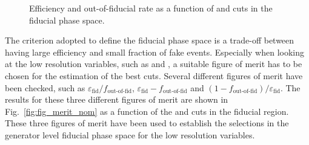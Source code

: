 \begin{figure}[htb]
\centering
{}
\caption{Efficiency and out-of-fiducial rate as a function of \MET and \mt cuts in the fiducial phase space.}\label{fig:eff_fake_nom}
\end{figure}

The criterion adopted to define the fiducial phase space is a trade-off between having large efficiency and small fraction of fake events. Especially when looking at the low resolution variables, such as \MET and \mt, a suitable figure of merit has to be chosen for the estimation of the best cuts. Several different figures of merit have been checked, such as $\varepsilon_\mathrm{fid}/f_\text{out-of-fid}$, $\varepsilon_\mathrm{fid} - f_\text{out-of-fid}$ and $(1-f_\text{out-of-fid})/\varepsilon_\mathrm{fid}$. The results for these three different figures of merit are shown in Fig.~\ref{fig:fig_merit_nom} as a function of the \MET and \mt cuts in the fiducial region. These three figures of merit have been used to establish the selections in the generator level fiducial phase space for the low resolution variables.

